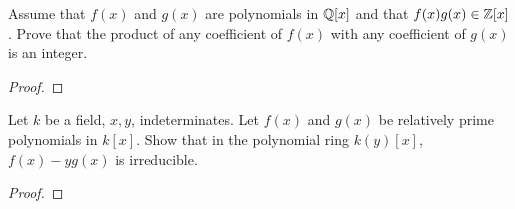 \begin{problem}
Assume that $f(x)$ and $g(x)$ are polynomials in $\mathbb{Q}[x]$ and that
$f(x)g(x)\in\mathbb{Z}[x]$. Prove that the product of any coefficient of $f(x)$
with any coefficient of $g(x)$ is an integer.
\end{problem}
\begin{proof}
\end{proof}

\begin{problem}
Let $k$ be a field, $x,y$, indeterminates. Let $f(x)$ and $g(x)$ be
relatively prime polynomials in $k[x]$. Show that in the polynomial ring
$k(y)[x]$, $f(x)-yg(x)$ is irreducible.
\end{problem}
\begin{proof}
\end{proof}

